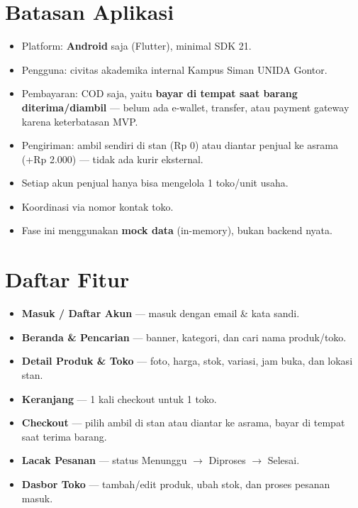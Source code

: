 \documentclass[11pt, a4paper]{article}
\begin{document}
\section{Batasan Aplikasi}

\begin{itemize}
  \item Platform: \textbf{Android} saja (Flutter), minimal SDK 21.
  \item Pengguna: civitas akademika internal Kampus Siman UNIDA Gontor.
  \item Pembayaran: COD saja, yaitu \textbf{bayar di tempat saat barang diterima/diambil} --- belum ada e-wallet, transfer, atau payment gateway karena keterbatasan MVP.
  \item Pengiriman: ambil sendiri di stan (Rp 0) atau diantar penjual ke asrama (+Rp 2.000) --- tidak ada kurir eksternal.
  \item Setiap akun penjual hanya bisa mengelola 1 toko/unit usaha.
  \item Koordinasi via nomor kontak toko.
  \item Fase ini menggunakan \textbf{mock data} (in-memory), bukan backend nyata.
\end{itemize}

\section{Daftar Fitur}

\begin{itemize}
  \item \textbf{Masuk / Daftar Akun} --- masuk dengan email \& kata sandi.
  \item \textbf{Beranda \& Pencarian} --- banner, kategori, dan cari nama produk/toko.
  \item \textbf{Detail Produk \& Toko} --- foto, harga, stok, variasi, jam buka, dan lokasi stan.
  \item \textbf{Keranjang} --- 1 kali checkout untuk 1 toko.
  \item \textbf{Checkout} --- pilih ambil di stan atau diantar ke asrama, bayar di tempat saat terima barang.
  \item \textbf{Lacak Pesanan} --- status Menunggu $\to$ Diproses $\to$ Selesai.
  \item \textbf{Dasbor Toko} --- tambah/edit produk, ubah stok, dan proses pesanan masuk.
\end{itemize}
\end{document}

